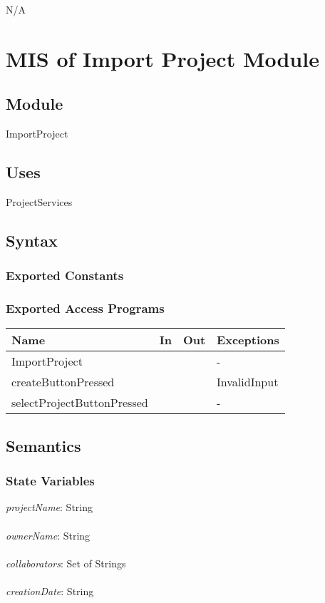 \documentclass[12pt, titlepage]{article}
\begin{document}
	N/A
	
	\newpage
	\section{MIS of Import Project Module} \label{Module} 
	
	\subsection{Module}
	
	ImportProject
	
	\subsection{Uses}
	ProjectServices
	
	\subsection{Syntax}
	
	\subsubsection{Exported Constants}
	
	\subsubsection{Exported Access Programs}
	
	\begin{center}
		\begin{tabular}{p{2cm} p{4cm} p{4cm} p{2cm}}
			\hline
			\textbf{Name} & \textbf{In} & \textbf{Out} & \textbf{Exceptions} \\
			\hline
			ImportProject &  &  & - \\
			\hline
			createButtonPressed &  &  & InvalidInput \\
			\hline
			selectProjectButtonPressed &  &  & - \\
			\hline
		\end{tabular}
	\end{center}
	
	\subsection{Semantics}
	
	\subsubsection{State Variables}
	\textit{projectName}: String \\\\ 
	\textit{ownerName}: String \\\\ 
	\textit{collaborators}: Set of Strings \\\\
	\textit{creationDate}: String \\\\
	
\end{document}
